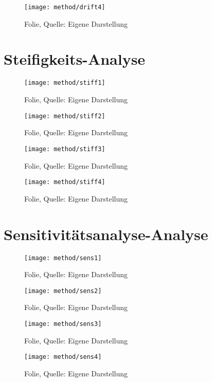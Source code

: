 \begin{figure}[H]
    \centering
    \texttt{[image: method/drift4]}
    \caption[Folie]{Folie, Quelle: Eigene Darstellung}
    \label{fig:drift4}
\end{figure}

\thispagestyle{scrheadings}
\section{Steifigkeits-Analyse}
\label{method-stiff}

\begin{figure}[H]
    \centering
    \texttt{[image: method/stiff1]}
    \caption[Folie]{Folie, Quelle: Eigene Darstellung}
    \label{fig:stiff1}
\end{figure}

\begin{figure}[H]
    \centering
    \texttt{[image: method/stiff2]}
    \caption[Folie]{Folie, Quelle: Eigene Darstellung}
    \label{fig:stiff2}
\end{figure}

\begin{figure}[H]
    \centering
    \texttt{[image: method/stiff3]}
    \caption[Folie]{Folie, Quelle: Eigene Darstellung}
    \label{fig:stiff3}
\end{figure}

\begin{figure}[H]
    \centering
    \texttt{[image: method/stiff4]}
    \caption[Folie]{Folie, Quelle: Eigene Darstellung}
    \label{fig:stiff4}
\end{figure}

\thispagestyle{scrheadings}
\section{Sensitivitätsanalyse-Analyse}
\label{method-sens}

\begin{figure}[H]
    \centering
    \texttt{[image: method/sens1]}
    \caption[Folie]{Folie, Quelle: Eigene Darstellung}
    \label{fig:sens1}
\end{figure}

\begin{figure}[H]
    \centering
    \texttt{[image: method/sens2]}
    \caption[Folie]{Folie, Quelle: Eigene Darstellung}
    \label{fig:sens2}
\end{figure}

\begin{figure}[H]
    \centering
    \texttt{[image: method/sens3]}
    \caption[Folie]{Folie, Quelle: Eigene Darstellung}
    \label{fig:sens3}
\end{figure}

\begin{figure}[H]
    \centering
    \texttt{[image: method/sens4]}
    \caption[Folie]{Folie, Quelle: Eigene Darstellung}
    \label{fig:sens4}
\end{figure}